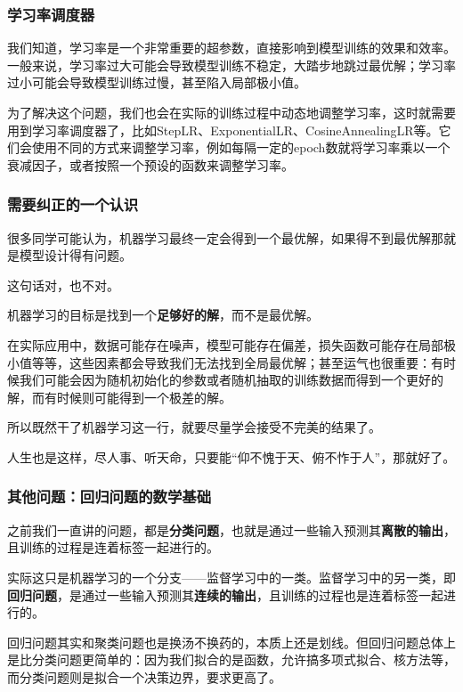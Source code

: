 \documentclass{ctexbeamer}
\begin{document}
\begin{frame}
    \frametitle{学习率调度器}

    我们知道，学习率是一个非常重要的超参数，直接影响到模型训练的效果和效率。一般来说，学习率过大可能会导致模型训练不稳定，大踏步地跳过最优解；学习率过小可能会导致模型训练过慢，甚至陷入局部极小值。

    为了解决这个问题，我们也会在实际的训练过程中动态地调整学习率，这时就需要用到学习率调度器了，比如StepLR、ExponentialLR、CosineAnnealingLR等。它们会使用不同的方式来调整学习率，例如每隔一定的epoch数就将学习率乘以一个衰减因子，或者按照一个预设的函数来调整学习率。

\end{frame}

\begin{frame}
    \frametitle{需要纠正的一个认识}

    很多同学可能认为，机器学习最终一定会得到一个最优解，如果得不到最优解那就是模型设计得有问题。

    这句话对，也不对。

    机器学习的目标是找到一个\textbf{足够好的解}，而不是最优解。

    在实际应用中，数据可能存在噪声，模型可能存在偏差，损失函数可能存在局部极小值等等，这些因素都会导致我们无法找到全局最优解；甚至运气也很重要：有时候我们可能会因为随机初始化的参数或者随机抽取的训练数据而得到一个更好的解，而有时候则可能得到一个极差的解。

    所以既然干了机器学习这一行，就要尽量学会接受不完美的结果了。

    人生也是这样，尽人事、听天命，只要能“仰不愧于天、俯不怍于人”，那就好了。


\end{frame}

\begin{frame}
    \frametitle{其他问题：回归问题的数学基础}

    之前我们一直讲的问题，都是\textbf{分类问题}，也就是通过一些输入预测其\textbf{离散的输出}，且训练的过程是连着标签一起进行的。

    实际这只是机器学习的一个分支——监督学习中的一类。监督学习中的另一类，即\textbf{回归问题}，是通过一些输入预测其\textbf{连续的输出}，且训练的过程也是连着标签一起进行的。

    回归问题其实和聚类问题也是换汤不换药的，本质上还是划线。但回归问题总体上是比分类问题更简单的：因为我们拟合的是函数，允许搞多项式拟合、核方法等，而分类问题则是拟合一个决策边界，要求更高了。



\end{frame}
\end{document}

